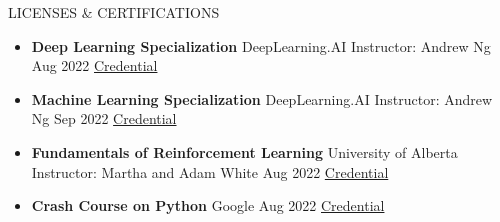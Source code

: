\documentclass[]{CV}
\begin{document}
\vspace{-4mm}
\begin{section}{LICENSES \& CERTIFICATIONS}
\begin{multicols}{2}
\begin{itemize}
\item {\textbf{Deep Learning Specialization} \newline DeepLearning.AI \newline Instructor: Andrew Ng \newline Aug 2022 \newline \href{https://www.coursera.org/account/accomplishments/specialization/certificate/LGYU3FW9F9AX}{Credential}}

\item {\textbf{Machine Learning Specialization} \newline DeepLearning.AI \newline Instructor: Andrew Ng \newline Sep 2022 \newline \href{https://www.coursera.org/account/accomplishments/specialization/certificate/JFDSEZCH8ECY}{Credential}}

\item {\textbf{Fundamentals of Reinforcement Learning} \newline University of Alberta \newline Instructor: Martha and Adam White \newline Aug 2022 \newline \href{https://www.coursera.org/account/accomplishments/certificate/L2QGQYLFC8DL}{Credential}}
\item {\textbf{Crash Course on Python} \newline Google \newline Aug 2022  \newline \href{https://www.coursera.org/account/accomplishments/certificate/V9RF53KNW4TS}{Credential}}
\end{itemize}
\end{multicols}
\end{section}
\end{document}
